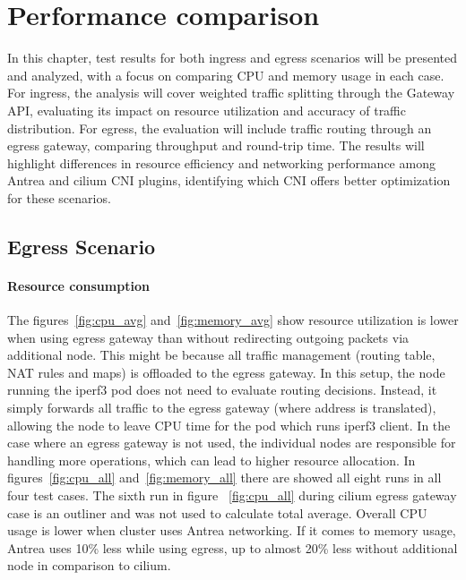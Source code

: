 \chapter{Performance comparison}
\label{cha:performCompare}

In this chapter, test results for both ingress and egress scenarios will be presented and analyzed, with a focus on comparing CPU and memory usage in each case. For ingress, the analysis will cover weighted traffic splitting through the Gateway API, evaluating its impact on resource utilization and accuracy of traffic distribution. For egress, the evaluation will include traffic routing through an egress gateway, comparing throughput and round-trip time. The results will highlight differences in resource efficiency and networking performance among Antrea and cilium CNI plugins, identifying which CNI offers better optimization for these scenarios.


\section{Egress Scenario}
\label{sec:egressComparison}

\subsubsection{Resource consumption}
\label{sec:egressResoureComsumption}



The figures~\ref{fig:cpu_avg} and~\ref{fig:memory_avg} show resource utilization is lower when using egress gateway than without redirecting outgoing packets via additional node. This might be because all traffic management (routing table, NAT rules and maps) is offloaded to the egress gateway. In this setup, the node running the iperf3 pod does not need to evaluate routing decisions. Instead, it simply forwards all traffic to the egress gateway (where address is translated), allowing the node to leave CPU time for the pod which runs iperf3 client. In the case where an egress gateway is not used, the individual nodes are responsible for handling more operations, which can lead to higher resource allocation. In figures~\ref{fig:cpu_all} and~\ref{fig:memory_all} there are showed all eight runs in all four test cases. The sixth run in figure ~\ref{fig:cpu_all} during cilium egress gateway case is an outliner and was not used to calculate total average. Overall CPU usage is lower when cluster uses Antrea networking. If it comes to memory usage, Antrea uses 10\% less while using egress, up to almost 20\% less without additional node in comparison to cilium.

